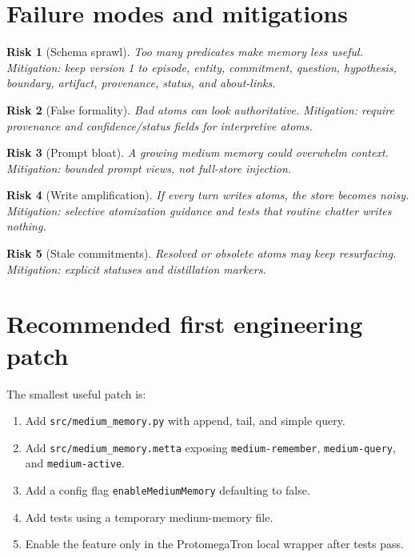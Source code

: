 \documentclass[11pt]{article}
\newtheorem{risk}{Risk}
\begin{document}
\section{Failure modes and mitigations}

\begin{risk}[Schema sprawl]
Too many predicates make memory less useful.
Mitigation: keep version 1 to episode, entity, commitment, question, hypothesis,
boundary, artifact, provenance, status, and about-links.
\end{risk}

\begin{risk}[False formality]
Bad atoms can look authoritative.
Mitigation: require provenance and confidence/status fields for interpretive atoms.
\end{risk}

\begin{risk}[Prompt bloat]
A growing medium memory could overwhelm context.
Mitigation: bounded prompt views, not full-store injection.
\end{risk}

\begin{risk}[Write amplification]
If every turn writes atoms, the store becomes noisy.
Mitigation: selective atomization guidance and tests that routine chatter writes nothing.
\end{risk}

\begin{risk}[Stale commitments]
Resolved or obsolete atoms may keep resurfacing.
Mitigation: explicit statuses and distillation markers.
\end{risk}

\section{Recommended first engineering patch}

The smallest useful patch is:
\begin{enumerate}
  \item Add \texttt{src/medium\_memory.py} with append, tail, and simple query.
  \item Add \texttt{src/medium\_memory.metta} exposing \texttt{medium-remember},
        \texttt{medium-query}, and \texttt{medium-active}.
  \item Add a config flag \texttt{enableMediumMemory} defaulting to false.
  \item Add tests using a temporary medium-memory file.
  \item Enable the feature only in the ProtomegaTron local wrapper after tests pass.
\end{enumerate}
\end{document}
